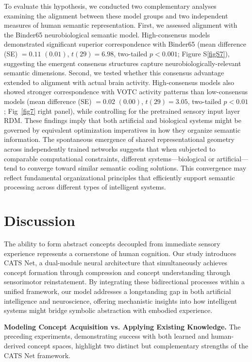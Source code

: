 \documentclass[pdflatex,sn-mathphys-num,lineno]{sn-jnl}%
\begin{document}
\begin{CJK}{UTF8}{gbsn}
To evaluate this hypothesis, we conducted two complementary analyses examining the alignment between these model groups and two independent measures of human semantic representation. First, we assessed alignment with the Binder65 neurobiological semantic model. High-consensus models demonstrated significant superior correspondence with Binder65 (mean difference (SE) $= 0.11$ $(0.01)$, $t(29) = 6.98$, two-tailed $p < 0.001$; Figure S\ref{figS7}), suggesting the emergent consensus structures capture neurobiologically-relevant semantic dimensions. Second, we tested whether this consensus advantage extended to alignment with actual brain activity. High-consensus models also showed stronger correspondence with VOTC activity patterns than low-consensus models (mean difference (SE) $= 0.02$ $(0.00)$, $t(29) = 3.05$, two-tailed $p < 0.01$; Fig~\ref{fig7} right panel), while controlling for the pretrained sensory input layer RDM. These findings imply that both artificial and biological systems might be governed by equivalent optimization imperatives in how they organize semantic information. The spontaneous emergence of shared representational geometry across independently trained networks suggests that when subjected to comparable computational constraints, different systems—biological or artificial— tend to converge toward similar semantic coding solutions. This convergence may reflect fundamental organizational principles that efficiently support semantic processing across different types of intelligent systems.

\section{Discussion}

The ability to form abstract concepts decoupled from immediate sensory experience represents a cornerstone of human cognition. Our study introduces CATS Net, a dual-module neural architecture that simultaneously achieves concept formation through compression and concept understanding through sensorimotor reinstatement. By integrating these bidirectional processes within a unified framework, our model addresses a longstanding gap in both artificial intelligence and neuroscience, offering mechanistic insights into how intelligent systems might bridge symbolic abstraction with embodied experience.

\textbf{Modeling Concept Acquisition vs. Applying Existing Knowledge.} The preceding experiments, demonstrating success with both learned and human-derived concept spaces, highlight two distinct but complementary strengths of the CATS Net framework. 


\end{CJK}
\end{document}
